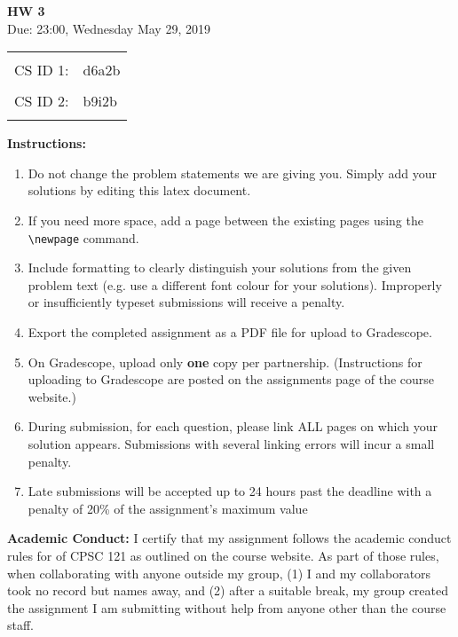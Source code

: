 \documentclass[a4paper, 20pt,fleqn]{article}
\begin{document}

\begin{center}
    \LARGE
    \textbf{HW 3}
    \\[1ex]
    \Large Due: 23:00, Wednesday May 29, 2019  \\
\end{center}
    \LARGE
\begin{tabular}{rl}
 & \\
CS ID 1: &  d6a2b\\
 & \\
CS ID 2: & b9i2b\\
 & \\
\end{tabular}
\large

\textbf{Instructions:}
\begin{enumerate}
\item Do not change the problem statements we are giving you. Simply add your solutions by editing this latex document. 
\item If you need more space, add a page between the existing pages using the \texttt{\textbackslash newpage} command.
\item Include formatting to clearly distinguish your solutions from the given problem text (e.g. use a different font colour for your solutions). Improperly or insufficiently typeset submissions will receive a penalty.
\item Export the completed assignment as a PDF file for upload to Gradescope.
\item On Gradescope, upload only \textbf{one} copy per partnership. (Instructions for uploading to Gradescope are posted on the assignments page of the course website.)
\item During submission, for each question, please link ALL pages on which your solution appears. Submissions with several linking errors will incur a small penalty.
\item Late submissions will be accepted up to 24 hours past the deadline with a penalty of 20\% of the assignment’s maximum value
\end{enumerate}

\textbf{Academic Conduct:} 
I certify that my assignment follows the academic conduct rules for of CPSC 121 as outlined on the course website. As part of those rules, when collaborating with anyone outside my group, (1) I and my collaborators took no record but names away, and (2) after a suitable break, my group created the assignment I am submitting without help from anyone other than the course staff. \\
\end{document}
